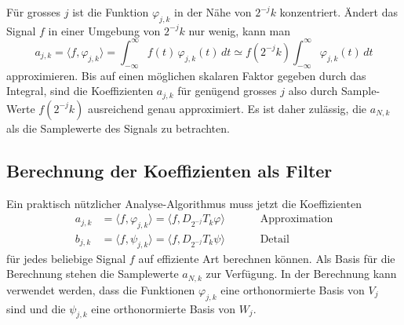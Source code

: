 Für grosses $j$ ist die Funktion $\varphi_{j,k}$ in der Nähe von $2^{-j}k$
konzentriert.
Ändert das Signal $f$ in einer Umgebung von $2^{-j}k$ nur wenig, kann man
\begin{equation*}
a_{j,k}
=
\langle f,\varphi_{j,k}\rangle
=
\int_{-\infty}^\infty f(t)\, \varphi_{j,k}(t)\,dt
\simeq
f(2^{-j}k)
\int_{-\infty}^\infty \varphi_{j,k}(t)\,dt
\end{equation*}
approximieren.
Bis auf einen möglichen skalaren Faktor gegeben durch das Integral, sind
die Koeffizienten $a_{j,k}$ für genügend grosses $j$ also durch
Sample-Werte $f(2^{-j}k)$ ausreichend genau approximiert.
Es ist daher zulässig, die $a_{N,k}$ als die Samplewerte des Signals
zu betrachten.

\subsection{Berechnung der Koeffizienten als Filter}
Ein praktisch nützlicher Analyse-Algorithmus muss jetzt die Koeffizienten
\[
\begin{aligned}
a_{j,k}
&=
\langle f, \varphi_{j,k}\rangle
=
\langle f, D_{2^{-j}}T_k\varphi \rangle
&&&&\text{Approximation}
\\
b_{j,k}
&=
\langle f, \psi_{j,k}\rangle
=
\langle f, D_{2^{-j}}T_k\psi \rangle
&&&&\text{Detail}
\end{aligned}
\]
für jedes beliebige Signal $f$ auf effiziente Art berechnen können.
Als Basis für die Berechnung stehen die Samplewerte $a_{N,k}$ zur 
Verfügung.
In der Berechnung kann verwendet werden, dass die Funktionen
$\varphi_{j,k}$ eine orthonormierte Basis von $V_j$ sind
und die $\psi_{j,k}$ eine orthonormierte Basis von $W_j$.

